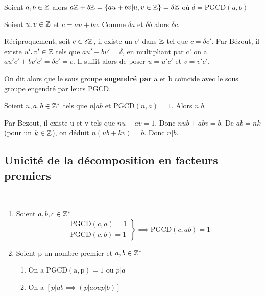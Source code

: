 \documentclass[a4paper, 12pt]{article}
\begin{document}
\begin{corollaire}
    Soient $a, b \in \mathbb{Z}$ alors $a\mathbb{Z} + b\mathbb{Z} = \{au + bv | u, v \in \mathbb{Z}\} = \delta \mathbb{Z}$ où $\delta = \mathrm{PGCD}(a, b)$
\end{corollaire}

\begin{demonstration}
    Soient $u, v \in \mathbb{Z}$ et $c = au + bv$. Comme $\delta a$ et $\delta b$ alors $\delta c$.

    Réciproquement, soit $c \in \delta\mathbb{Z}$, il existe un c' dans $\mathbb{Z}$ tel que $c = \delta c'$. Par Bézout, il existe
    $u', v' \in \mathbb{Z}$ tels que $au' + bv' = \delta$, en multipliant par c' on a $au'c' + bv'c' = \delta c' = c$. Il suffit alors
    de poser $u = u'c'$ et $v = v'c'$.

    On dit alors que le sous groupe \textbf{engendré par} a et b coïncide avec le sous groupe engendré par leurs PGCD.
\end{demonstration}

\begin{proposition}[Gauss]
    Soient $n, a, b \in \mathbb{Z}^*$ tels que $n | ab$ et $\mathrm{PGCD}(n, a) = 1$. Alors $n|b$.
\end{proposition}

\begin{demonstration}
    Par Bezout, il existe u et v tels que $nu + av = 1$. Donc $nub + abv = b$. De $ab = nk$ (pour un $k \in \mathbb{Z}$),
    on déduit $n(ub + kv) = b$. Donc $n | b$.
\end{demonstration}

\subsection{Unicité de la décomposition en facteurs premiers}

\begin{lemme}\
    \begin{enumerate}
        \item Soient $a, b, c \in \mathbb{Z}^*$
        \begin{equation*}
            \left.
            \begin{array}{l}
            \mathrm{PGCD}(c, a) = 1 \\
            \mathrm{PGCD}(c, b) = 1
            \end{array}
            \right\}
            \implies \mathrm{PGCD}(c, ab) = 1
        \end{equation*}
        \item Soient p un nombre premier et $a, b \in \mathbb{Z}^*$
        \begin{enumerate}
            \item On a $\mathrm{PGCD(a, p) = 1}$ ou $p | a$
            \item On a $[p|ab \implies (p|a ou p|b)]$
        \end{enumerate}
    \end{enumerate}
\end{lemme}
\end{document}
